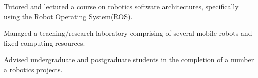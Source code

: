 \documentclass[a4paper]{awesome-deedy}
\begin{document}
\begin{minipage}[t]{0.66\textwidth}
\begin{tightemize}
\item Tutored and lectured a course on robotics software architectures, specifically using the Robot Operating System(ROS).
\item Managed a teaching/research laboratory comprising of several mobile robots and fixed computing resources.
\item Advised undergraduate and postgraduate students in the completion of a number a robotics projects.
\end{tightemize}
\sectionsep


\end{minipage}
\end{document}
